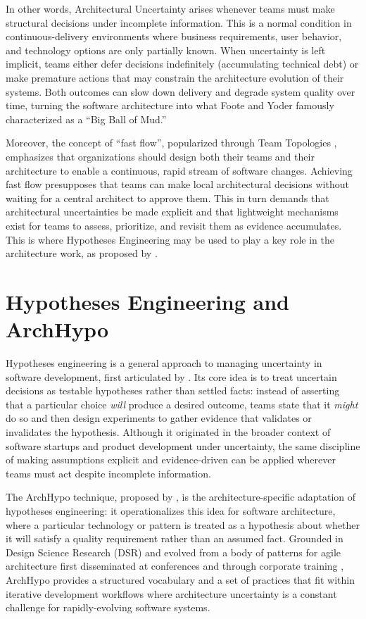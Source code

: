 In other words, Architectural Uncertainty arises whenever teams must make structural decisions under
incomplete information. This is a normal condition in continuous-delivery environments
where business requirements, user behavior, and technology options are only partially
known. When uncertainty is left implicit, teams either defer decisions indefinitely
(accumulating technical debt) or make premature actions that may constrain the
architecture evolution of their systems. Both outcomes can slow down delivery and degrade system
quality over time, turning the software architecture into what Foote and Yoder \citeyearpar{footeYoder1999} famously characterized as a ``Big Ball of Mud.''

Moreover, the concept of ``fast flow'', popularized through Team Topologies \citep{skelton2019}, emphasizes that organizations should design both their
teams and their architecture to enable a continuous, rapid stream of software changes.
Achieving fast flow presupposes that teams can make local architectural decisions
without waiting for a central architect to approve them. This in turn demands that architectural
uncertainties be made explicit and that lightweight mechanisms exist for teams to assess, prioritize, and revisit them as evidence accumulates. 
This is where Hypotheses Engineering may be used to play a key role in the architecture work, as proposed by \citet{silva2024tse}.

\section{Hypotheses Engineering and ArchHypo}
\label{sec:archhypo}

Hypotheses engineering is a general approach to managing uncertainty in software
development, first articulated by \citet{melegati2019he}. Its core idea is to treat
uncertain decisions as testable hypotheses rather than settled facts: instead of
asserting that a particular choice \emph{will} produce a desired outcome, teams state
that it \emph{might} do so and then design experiments to gather evidence that
validates or invalidates the hypothesis. Although it originated in the broader context
of software startups and product development under uncertainty, the same discipline of
making assumptions explicit and evidence-driven can be applied wherever teams must
act despite incomplete information.

The ArchHypo technique, proposed by \citet{silva2024tse}, is the architecture-specific
adaptation of hypotheses engineering: it operationalizes this idea for software
architecture, where a particular technology or pattern is treated as a hypothesis about
whether it will satisfy a quality requirement rather than an assumed fact. Grounded in
Design Science Research (DSR) and evolved from a body of patterns for agile architecture
first disseminated at conferences and through corporate training
\citep{silva2024patterns,silva2024ieeesw}, ArchHypo provides a structured vocabulary and
a set of practices that fit within iterative development workflows where architecture
uncertainty is a constant challenge for rapidly-evolving software systems.

